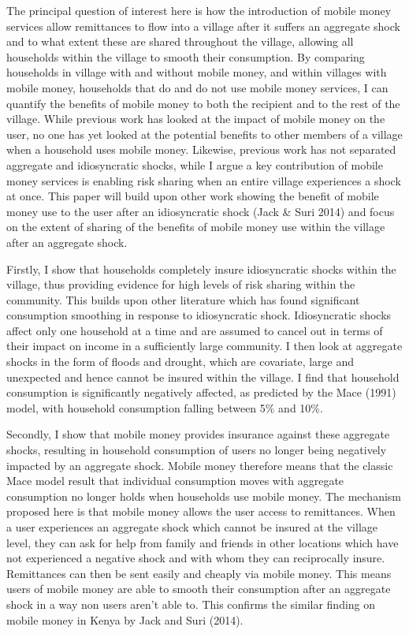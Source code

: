 The principal question of interest here is how the introduction of mobile money services allow remittances to flow into a village after it suffers an aggregate shock and to what extent these are shared throughout the village, allowing all households within the village to smooth their consumption. By comparing households in village with and without mobile money, and within villages with mobile money, households that do and do not use mobile money services, I can quantify the benefits of mobile money to both the recipient and to the rest of the village. While previous work has looked at the impact of mobile money on the user, no one has yet looked at the potential benefits to other members of a village when a household uses mobile money. Likewise, previous work has not separated aggregate and idiosyncratic shocks, while I argue a key contribution of mobile money services is enabling risk sharing when an entire village experiences a shock at once. This paper will build upon other work showing the benefit of mobile money use to the user after an idiosyncratic shock (Jack \& Suri 2014) and focus on the extent of sharing of the benefits of mobile money use within the village after an aggregate shock. 
 
Firstly, I show that households completely insure idiosyncratic shocks within the village, thus providing evidence for high levels of  risk sharing within the community. This builds upon other literature which has found significant consumption smoothing in response to idiosyncratic shock. Idiosyncratic shocks affect only one household at a time and are assumed to cancel out in terms of their impact on income in a sufficiently large community. I then look at aggregate shocks in the form of floods and drought, which are covariate, large and unexpected and hence cannot be insured within the village. I find that household consumption is significantly negatively affected, as predicted by the Mace (1991) model, with household consumption falling between 5\% and 10\%.  

Secondly, I show that mobile money provides insurance against these aggregate shocks, resulting in household consumption of users no longer being negatively impacted by an aggregate shock. Mobile money therefore means that the classic Mace model result that individual consumption moves with aggregate consumption no longer holds when households use mobile money. The mechanism proposed here is that mobile money allows the user access to remittances. When a user experiences an aggregate shock which cannot be insured at the village level, they can ask for help from family and friends in other locations which have not experienced a negative shock and with whom they can reciprocally insure. Remittances can then be sent easily and cheaply via mobile money. This means users of mobile money are able to smooth their consumption after an aggregate shock in a way non users aren't able to. This confirms the similar finding on mobile money in Kenya by Jack and Suri (2014).   

